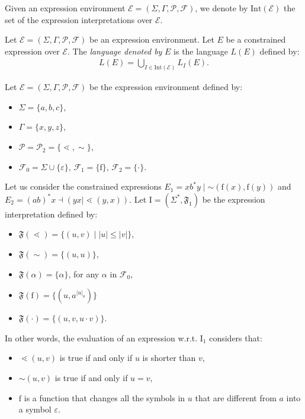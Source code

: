 \documentclass[a4paper]{llncs}
\begin{document}
  Given an expression environment $\mathcal{E}=(\Sigma,\Gamma,\mathcal{P},\mathcal{F})$, we denote by $\mathrm{Int}(\mathcal{E})$ the set of the expression interpretations over $\mathcal{E}$.
    
  \begin{definition}[Language]
    Let $\mathcal{E}=(\Sigma,\Gamma,\mathcal{P},\mathcal{F})$ be an expression environment. Let $E$ be a constrained expression over $\mathcal{E}$. The \emph{language denoted by} $E$ is the language $L(E)$ defined by:
    \begin{align*}
      L(E)=\bigcup_{I\in \mathrm{Int}(\mathcal{E})}L_{I}(E).
    \end{align*}
  \end{definition}
  
  \begin{example}\label{ex exp cons lang}
    Let $ \mathcal{E}=(\Sigma,\Gamma,\mathcal{P},\mathcal{F})$ be the expression environment defined by:
    \begin{itemize}
      \item $\Sigma=\{a,b,c\}$,
      \item $\Gamma=\{x,y,z\}$,
      \item $\mathcal{P}=\mathcal{P}_2=\{\lessdot,\sim\}$,
      \item $\mathcal{F}_0=\Sigma\cup\{\varepsilon\}$, $\mathcal{F}_1=\{\mathrm{f}\}$, $\mathcal{F}_2=\{\cdot\}$.
    \end{itemize}    
    Let us consider the constrained expressions $E_1=xb^*y\mid \mathopen{\sim}(\mathrm{f}(x),\mathrm{f}(y))$ and $E_2= (ab)^*x \dashv (yx\mid \lessdot (y,x))$. 
    Let $\mathrm{I}=(\Sigma^*,\mathfrak{F}_1)$ be the expression interpretation defined by:
    \begin{itemize}
      \item $\mathfrak{F}(\lessdot)=\{(u,v)\mid |u|\leq |v| \}$,
      \item $\mathfrak{F}(\sim)=\{(u,u)\}$,
      \item $\mathfrak{F}(\alpha)=\{\alpha\}$, for any $\alpha$ in $\mathcal{F}_0$, 
      \item $\mathfrak{F}(\mathrm{f})=\{(u,a^{|u|_a})\}$
      \item $\mathfrak{F}(\cdot)=\{(u,v,u\cdot v)\}$.
    \end{itemize}
    
    In other words, the evaluation of an expression w.r.t. $\mathrm{I}_1$ considers that:
    \begin{itemize}
      \item $\lessdot(u,v)$ is true if and only if $u$ is shorter than $v$,
      \item $\sim(u,v)$ is true if and only if $u=v$,
      \item $\mathrm{f}$ is a function that changes all the symbols in $u$ that are different from $a$ into a symbol $\varepsilon$.
    \end{itemize}
    

\end{example}
\end{document}
